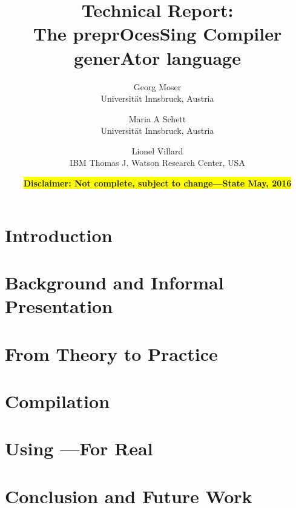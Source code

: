\documentclass[onesided]{scrartcl}
\title{Technical Report: \Tosca  \\[0.5em]
       \large{The preprOcesSing Compiler generAtor language} }
\author{\small Georg Moser \\
        Universit\"at Innsbruck, Austria \\
        \email{georg.moser}{uibk.ac.at}
\and
       Maria A Schett \\
       \small{Universit\"at Innsbruck, Austria} \\
       \email{mail}{maria-a-schett.net}
\and
       Lionel Villard \\
       \small{IBM Thomas J. Watson Research Center, USA} \\
       \email{villard}{us.ibm.com}
}
\theoremstyle{plain}
\theoremstyle{definition}
\theoremstyle{remark}
\begin{document}

\date{\bf\colorbox{yellow}{Disclaimer: Not complete, subject to change---State May, 2016}}

\maketitle


\section{Introduction} \label{sec:introduction}


\section{Background and Informal Presentation} \label{sec:bg}

   
\section{From Theory to Practice} \label{sec:theory_practice}


\section{Compilation} \label{sec:architecture}


\section{Using \Tosca---For Real} 
 \label{sec:self-hosting} \label{sec:forreal}


\section{Conclusion and Future Work}
\label{sec:conclusion}




\end{document}

